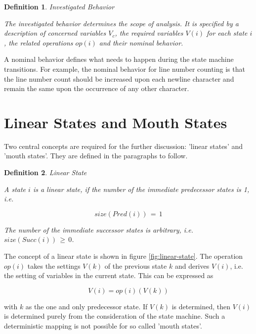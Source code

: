 \documentclass[12pt,a4paper]{scrartcl}
\newtheorem{definition}{Definition}
\begin{document}
\begin{definition} Investigated Behavior 

The investigated behavior determines the scope of analysis. It is
specified by a description of concerned variables $V_c$, the required
variables $V(i)$ for each state $i$, the related operations $op(i)$ and
their nominal behavior.
\end{definition}
    
A nominal behavior defines what needs to happen during the state machine
transitions.  For example, the nominal behavior for line number counting is
that the line number count should be increased upon each newline character
and remain the same upon the occurrence of any other character. 

%
\section{Linear States and Mouth States}

Two central concepts are required for the further discussion: 'linear states'
and 'mouth states'.  They are defined in the paragraphs to follow. 

\begin{definition}
Linear State

A state $i$ is a linear state, if the number of the immediate predecessor states is
1, i.e. 

\begin{equation}
                           size(Pred(i))\,=\,1
\end{equation}

The number of the immediate successor states is arbitrary, i.e.
$size(Succ(i))\,\ge\,0$.

\end{definition}

The concept of a linear state is shown in figure \eqref{fig:linear-state}. The
operation $op(i)$ takes the settings $V(k)$ of the previous state $k$
and derives $V(i)$, i.e.  the setting of variables in the current state. This
can be expressed as 

\begin{equation} \label{eq:accumulation}
            V(i) = op(i)(V(k))                                         
\end{equation}

with $k$ as the one and only predecessor state. If $V(k)$ is determined, then
$V(i)$ is determined purely from the consideration of the state machine. Such a
deterministic mapping is not possible for so called 'mouth states'.
\end{document}
